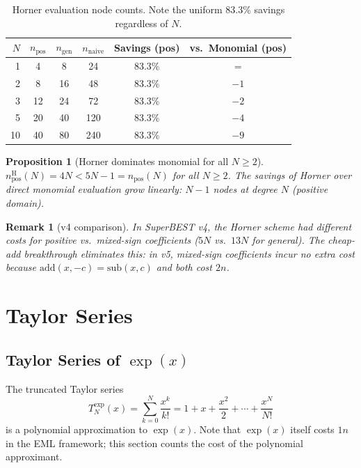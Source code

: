 \documentclass[11pt,a4paper]{article}
\newtheorem{proposition}[theorem]{Proposition}
\newtheorem{remark}{Remark}[section]
\begin{document}
\begin{table}[h]
\centering
\caption{Horner evaluation node counts. Note the uniform 83.3\% savings regardless of $N$.}
\label{tab:horner}
\begin{tabular}{rccccc}
\toprule
$N$ & $n_\text{pos}$ & $n_\text{gen}$ & $n_\text{naive}$ & Savings (pos) & vs.\ Monomial (pos) \\
\midrule
1  & 4  & 8  & 24  & 83.3\% & $=$ \\
2  & 8  & 16 & 48  & 83.3\% & $-1$ \\
3  & 12 & 24 & 72  & 83.3\% & $-2$ \\
5  & 20 & 40 & 120 & 83.3\% & $-4$ \\
10 & 40 & 80 & 240 & 83.3\% & $-9$ \\
\bottomrule
\end{tabular}
\end{table}

\begin{proposition}[Horner dominates monomial for all $N \geq 2$]
  $n_\mathrm{pos}^\mathrm{H}(N) = 4N < 5N - 1 = n_\mathrm{pos}(N)$ for all $N \geq 2$.
  The savings of Horner over direct monomial evaluation grow linearly: $N - 1$ nodes at
  degree $N$ (positive domain).
\end{proposition}

\begin{remark}[v4 comparison]
  In SuperBEST v4, the Horner scheme had \emph{different} costs for positive vs.\ mixed-sign
  coefficients ($5N$ vs.\ $13N$ for general). The cheap-add breakthrough eliminates this:
  in v5, mixed-sign coefficients incur no extra cost because $\text{add}(x, -c) =
  \text{sub}(x, c)$ and both cost $2n$.
\end{remark}

\section{Taylor Series}

\subsection{Taylor Series of $\exp(x)$}

The truncated Taylor series
\[
  T_N^{\exp}(x) = \sum_{k=0}^{N} \frac{x^k}{k!} = 1 + x + \frac{x^2}{2} + \cdots + \frac{x^N}{N!}
\]
is a polynomial approximation to $\exp(x)$. Note that $\exp(x)$ itself costs $1n$ in the
EML framework; this section counts the cost of the polynomial approximant.
\end{document}
